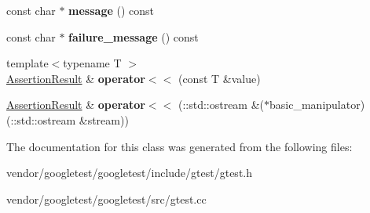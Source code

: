 \begin{DoxyCompactItemize}
const char $\ast$ {\bfseries message} () const
\item 
\mbox{\label{classtesting_1_1_assertion_result_aa38908d5a48c912434a80c8725f52583}} 
const char $\ast$ {\bfseries failure\+\_\+message} () const
\item 
\mbox{\label{classtesting_1_1_assertion_result_a3230efa81aafe7c61f5fb878cfa39e91}} 
{\footnotesize template$<$typename T $>$ }\\\hyperlink{classtesting_1_1_assertion_result}{Assertion\+Result} \& {\bfseries operator$<$$<$} (const T \&value)
\item 
\mbox{\label{classtesting_1_1_assertion_result_a43ae8a260843ce2ff3dc9af262672b8b}} 
\hyperlink{classtesting_1_1_assertion_result}{Assertion\+Result} \& {\bfseries operator$<$$<$} (\+::std\+::ostream \&($\ast$basic\+\_\+manipulator)(\+::std\+::ostream \&stream))
\end{DoxyCompactItemize}


The documentation for this class was generated from the following files\+:\begin{DoxyCompactItemize}
\item 
vendor/googletest/googletest/include/gtest/gtest.\+h\item 
vendor/googletest/googletest/src/gtest.\+cc\end{DoxyCompactItemize}
